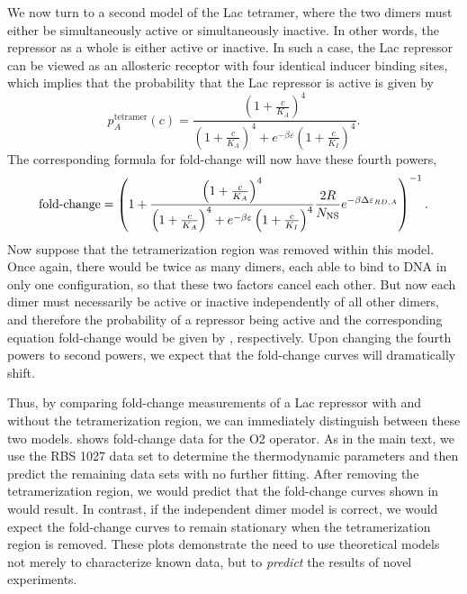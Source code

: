 We now turn to a second model of the Lac tetramer, where the two dimers must
either be simultaneously active or simultaneously inactive. In other words, the
repressor as a whole is either active or inactive. In such a case, the Lac
repressor can be viewed as an allosteric receptor with four identical inducer
binding sites, which implies that the probability that the Lac repressor is
active is given by
\begin{equation}\label{AppendixEq3}
p_A^{\text{tetramer}}(c)=\frac{\left(1+\frac{c}{K_A}\right)^4}{\left(1+\frac{c}{K_A}\right)^4+e^{-\beta  \varepsilon }\left(1+\frac{c}{K_I}\right)^4}.
\end{equation}
The corresponding formula for fold-change will now have these fourth powers,
\begin{equation}\label{AppendixEq4}
\operatorname{fold-change}= \left(
1+\frac{\left(1+\frac{c}{K_A}\right)^4}{\left(1+\frac{c}{K_A}\right)^4+e^{-\beta  \varepsilon }\left(1+\frac{c}{K_I}\right)^4}\frac{2 R}{N_{\text{NS}}}e^{-\beta \Delta\varepsilon_{RD,A}} \right)^{-1}.
\end{equation}
Now suppose that the tetramerization region was removed within this model. Once
again, there would be twice as many dimers, each able to bind to DNA in only one
configuration, so that these two factors cancel each other. But now each dimer
must necessarily be active or inactive independently of all other dimers, and
therefore the probability of a repressor being active and the corresponding
equation fold-change would be given by \eref[AppendixEq1][AppendixEq2],
respectively. Upon changing the fourth powers to second powers, we expect that
the fold-change curves will dramatically shift.

Thus, by comparing fold-change measurements of a Lac repressor with and without
the tetramerization region, we can immediately distinguish between these two
models. \fref[figAllosteryModels1] shows fold-change data for the O2
operator. As in the main text, we use the RBS 1027 data set to determine the
thermodynamic parameters and then predict the remaining data sets with no
further fitting. After removing the tetramerization region, we would predict
that the fold-change curves shown in \fref[figAllosteryModels1] would
result. In contrast, if the independent dimer model is correct, we would expect
the fold-change curves to remain stationary when the tetramerization region is
removed. These plots demonstrate the need to use theoretical models not merely
to characterize known data, but to \textit{predict} the results of novel
experiments.

